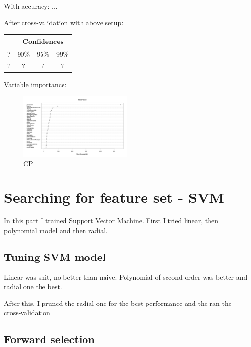 \documentclass[%
 aip,
 jmp,%
 amsmath,amssymb,
 reprint,%
]{revtex4-1}
\begin{document}
With accuracy: ...

After cross-validation with above setup:

\begin{center}
	\begin{tabular}{c|c|c|c|}
    	  & \multicolumn{3}{|c|}{\textbf{Confidences}} \\
		\hline
		? & 90\% & 95\% & 99\% \\
		\hline
		? & ? & ? & ? \\
		\hline
	\end{tabular}
\end{center}


Variable importance:

\begin{figure}[h]
	\centering

	\includegraphics[width=0.5\textwidth]{graphics/importance.png}

	\caption{CP}
\end{figure}

\newpage

\section{Searching for feature set - SVM}

In this part I trained Support Vector Machine. First I tried linear, then polynomial model and then radial.

\subsection{Tuning SVM model}

Linear was shit, no better than naive. Polynomial of second order was better and radial one the best.

After this, I pruned the radial one for the best performance and the ran the cross-validation

\subsection{Forward selection}
\end{document}
